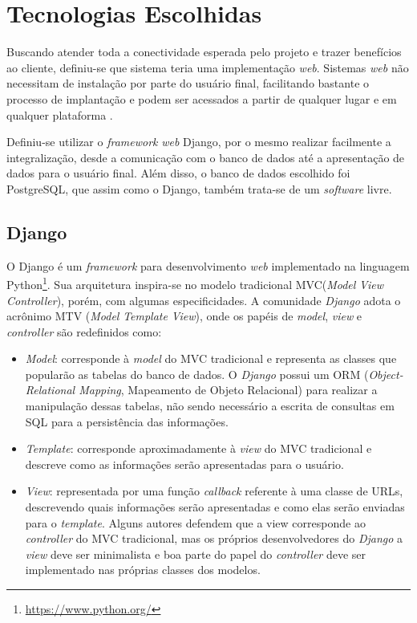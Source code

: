 \section{Tecnologias Escolhidas}
Buscando atender toda a conectividade esperada pelo projeto e trazer benefícios ao cliente, definiu-se que sistema teria uma implementação \textit{web}. Sistemas \textit{web} não necessitam de instalação por parte do usuário final, facilitando bastante o processo de implantação e podem ser acessados a partir de qualquer lugar e em qualquer plataforma \cite{pressman_2009}.

Definiu-se utilizar o \textit{framework} \textit{web} Django, por o mesmo realizar facilmente a integralização, desde a comunicação com o banco de dados até a apresentação de dados para o usuário final. Além disso, o banco de dados escolhido foi PostgreSQL, que assim como o Django, também trata-se de um \textit{software} livre.

    \subsection{Django}

    O Django \cite{django_project} é um \textit{framework} para desenvolvimento \textit{web} implementado na linguagem Python\footnote{\url{https://www.python.org/}}. Sua arquitetura inspira-se no modelo tradicional MVC(\textit{Model} \textit{View} \textit{Controller}), porém, com algumas especificidades. A comunidade \textit{Django} adota o acrônimo MTV (\textit{Model} \textit{Template} \textit{View}), onde os papéis de \textit{model}, \textit{view} e \textit{controller} são redefinidos como:
    \begin{itemize}
        \item \textit{Model}: corresponde à \textit{model} do MVC tradicional e representa as classes que popularão as tabelas do banco de dados. O \textit{Django} possui um ORM (\textit{Object-Relational Mapping}, Mapeamento de Objeto Relacional) para realizar a manipulação dessas tabelas, não sendo necessário a escrita de consultas em SQL para a persistência das informações.
        \item \textit{Template}: corresponde aproximadamente à \textit{view} do MVC tradicional e descreve como as informações serão apresentadas para o usuário.
        \item \textit{View}: representada por uma função \textit{callback} referente à uma classe de URLs, descrevendo quais informações serão apresentadas e como elas serão enviadas para o \textit{template}. Alguns autores defendem que a view corresponde ao \textit{controller} do MVC tradicional, mas os próprios desenvolvedores do \textit{Django} a \textit{view} deve ser minimalista e boa parte do papel do \textit{controller} deve ser implementado nas próprias classes dos modelos.
    \end{itemize}

